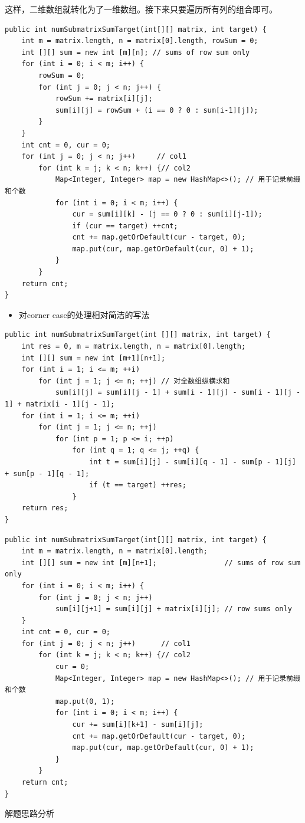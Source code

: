 \documentclass[9pt, b5paaper]{book}
\begin{document}
这样，二维数组就转化为了一维数组。接下来只要遍历所有列的组合即可。
\begin{verbatim}
public int numSubmatrixSumTarget(int[][] matrix, int target) {
    int m = matrix.length, n = matrix[0].length, rowSum = 0;
    int [][] sum = new int [m][n]; // sums of row sum only
    for (int i = 0; i < m; i++) {
        rowSum = 0;
        for (int j = 0; j < n; j++) {
            rowSum += matrix[i][j];
            sum[i][j] = rowSum + (i == 0 ? 0 : sum[i-1][j]);
        }
    }
    int cnt = 0, cur = 0;
    for (int j = 0; j < n; j++)     // col1
        for (int k = j; k < n; k++) {// col2
            Map<Integer, Integer> map = new HashMap<>(); // 用于记录前缀和个数
            for (int i = 0; i < m; i++) {
                cur = sum[i][k] - (j == 0 ? 0 : sum[i][j-1]);
                if (cur == target) ++cnt;
                cnt += map.getOrDefault(cur - target, 0);
                map.put(cur, map.getOrDefault(cur, 0) + 1);
            }
        }
    return cnt;
}
\end{verbatim}
\begin{itemize}
\item 对corner case的处理相对简洁的写法
\end{itemize}
\begin{verbatim}
public int numSubmatrixSumTarget(int [][] matrix, int target) { 
    int res = 0, m = matrix.length, n = matrix[0].length;
    int [][] sum = new int [m+1][n+1];
    for (int i = 1; i <= m; ++i) 
        for (int j = 1; j <= n; ++j) // 对全数组纵横求和
            sum[i][j] = sum[i][j - 1] + sum[i - 1][j] - sum[i - 1][j - 1] + matrix[i - 1][j - 1];
    for (int i = 1; i <= m; ++i) 
        for (int j = 1; j <= n; ++j) 
            for (int p = 1; p <= i; ++p) 
                for (int q = 1; q <= j; ++q) {
                    int t = sum[i][j] - sum[i][q - 1] - sum[p - 1][j] + sum[p - 1][q - 1];
                    if (t == target) ++res;
                }
    return res;
}
\end{verbatim}
\begin{verbatim}
public int numSubmatrixSumTarget(int[][] matrix, int target) {
    int m = matrix.length, n = matrix[0].length;
    int [][] sum = new int [m][n+1];                // sums of row sum only
    for (int i = 0; i < m; i++) {
        for (int j = 0; j < n; j++) 
            sum[i][j+1] = sum[i][j] + matrix[i][j]; // row sums only
    }
    int cnt = 0, cur = 0;
    for (int j = 0; j < n; j++)      // col1
        for (int k = j; k < n; k++) {// col2
            cur = 0;
            Map<Integer, Integer> map = new HashMap<>(); // 用于记录前缀和个数
            map.put(0, 1);
            for (int i = 0; i < m; i++) {
                cur += sum[i][k+1] - sum[i][j];
                cnt += map.getOrDefault(cur - target, 0);
                map.put(cur, map.getOrDefault(cur, 0) + 1);
            }
        }
    return cnt;
}
\end{verbatim}
解题思路分析
\end{document}
